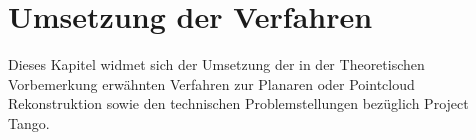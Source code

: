 \chapter{Umsetzung der Verfahren}

Dieses Kapitel widmet sich der Umsetzung der in der Theoretischen Vorbemerkung erwähnten Verfahren zur Planaren oder Pointcloud Rekonstruktion sowie den technischen Problemstellungen bezüglich Project Tango.


